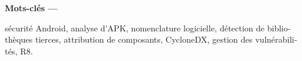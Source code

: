 \vspace{0.5cm}
\noindent\textbf{Mots-clés ---}
\begin{otherlanguage}{french}
sécurité Android, analyse d'APK, nomenclature logicielle, détection de
bibliothèques tierces, attribution de composants, CycloneDX, gestion des
vulnérabilités, R8.
\end{otherlanguage}
